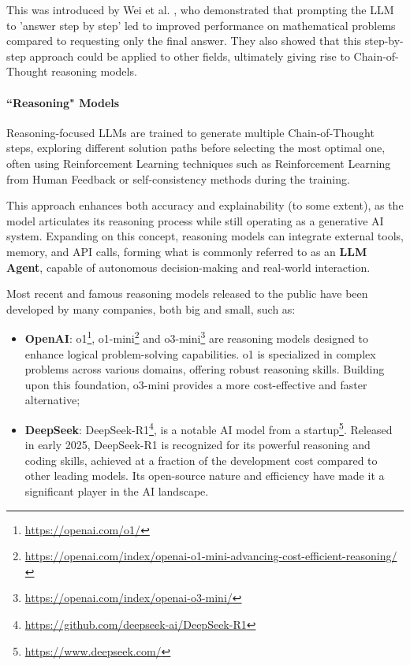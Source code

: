 This was introduced by Wei et al. \cite{wei2023chainofthoughtpromptingelicitsreasoning},
who demonstrated that prompting the LLM to 'answer step by step' led to improved
performance on mathematical problems compared to requesting only the final
answer. They also showed that this step-by-step approach could be applied to other
fields, ultimately giving rise to Chain-of-Thought reasoning models.

\paragraph{``Reasoning" Models}
Reasoning-focused LLMs are trained to generate multiple Chain-of-Thought steps,
exploring different solution paths before selecting the most optimal one, often using
Reinforcement Learning \cite{deepseekai2025deepseekr1incentivizingreasoningcapability}
techniques such as Reinforcement Learning from Human Feedback or self-consistency
methods during the training.

This approach enhances both accuracy and explainability (to some extent), as the
model articulates its reasoning process while still operating as a generative AI
system. Expanding on this concept, reasoning models can integrate external tools,
memory, and API calls, forming what is commonly referred to as an \textbf{LLM
Agent}, capable of autonomous decision-making and real-world interaction.

Most recent and famous reasoning models released to the public have been developed
by many companies, both big and small, such as:
\begin{itemize}
  \item \textbf{OpenAI}: o1\footnote{\url{https://openai.com/o1/}}, o1-mini\footnote{\url{https://openai.com/index/openai-o1-mini-advancing-cost-efficient-reasoning/}}
    and o3-mini\footnote{\url{https://openai.com/index/openai-o3-mini/}} are reasoning
    models designed to enhance logical problem-solving capabilities. o1 is
    specialized in complex problems across various domains, offering robust reasoning
    skills. Building upon this foundation, o3-mini provides a more cost-effective
    and faster alternative;

  \item \textbf{DeepSeek}: DeepSeek-R1\footnote{\url{https://github.com/deepseek-ai/DeepSeek-R1}},
    is a notable AI model from a startup\footnote{\url{https://www.deepseek.com/}}.
    Released in early 2025, DeepSeek-R1 is recognized for its powerful reasoning
    and coding skills, achieved at a fraction of the development cost compared to
    other leading models. Its open-source nature and efficiency have made it a
    significant player in the AI landscape.
\end{itemize}

